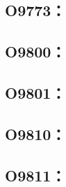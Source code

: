 \clearpage
\subsection{O9773：}



\clearpage
\subsection{O9800：}



\clearpage
\subsection{O9801：}



\clearpage
\subsection{O9810：}



\clearpage
\subsection{O9811：}



\clearpage
